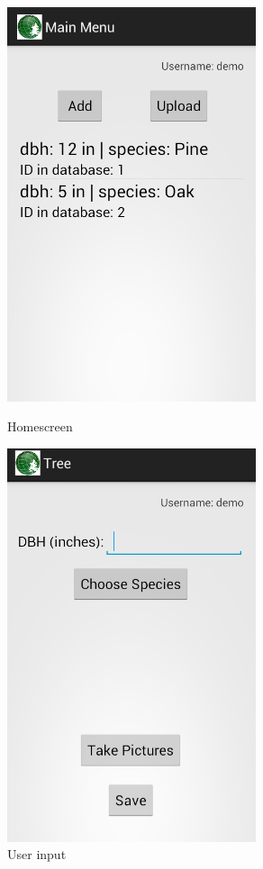 \begin{figure}[!htb]
		\centering
  		\includegraphics[width=0.65\textwidth]{main.png}
	  	\caption{Homescreen}
  		\label{main}
	\endminipage\hfill
		\centering
	  	\includegraphics[width=0.65\textwidth]{input.png}
	  	\caption{User input}
  		\label{input}
	\endminipage\hfill
\end{figure}
